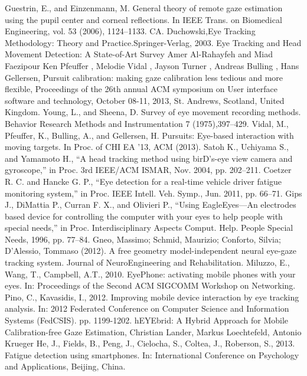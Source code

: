   \begin{thebibliography}{00}
    Guestrin, E., and Einzenmann, M. General theory of remote gaze estimation using the pupil center and corneal reflections. In IEEE Trans. on Biomedical Engineering, vol. 53 (2006), 1124–1133.
   CA. Duchowski,Eye Tracking Methodology: Theory and Practice.Springer-Verlag, 2003.
   Eye Tracking and Head Movement Detection: A State-of-Art Survey Amer Al-Rahayfeh and Miad Faezipour
   Ken Pfeuffer , Melodie Vidal , Jayson Turner , Andreas Bulling , Hans Gellersen, Pursuit calibration: making gaze calibration less tedious and more flexible, Proceedings of the 26th annual ACM symposium on User interface software and technology, October 08-11, 2013, St. Andrews, Scotland, United Kingdom.
   Young, L., and Sheena, D. Survey of eye movement recording methods. Behavior Research Methods and Instrumentation 7 (1975),397–429.
   Vidal, M., Pfeuffer, K., Bulling, A., and Gellersen, H. Pursuits: Eye-based interaction with moving targets. In Proc. of CHI EA ’13, ACM (2013).
   Satoh K., Uchiyama S., and Yamamoto H., “A head tracking method using birD's-eye view camera and gyroscope,” in Proc. 3rd IEEE/ACM ISMAR, Nov. 2004, pp. 202–211.
   Coetzer R. C. and Hancke G. P., “Eye detection for a real-time vehicle driver fatigue monitoring system,” in Proc. IEEE Intell. Veh. Symp., Jun. 2011, pp. 66–71.
   Gips J., DiMattia P., Curran F. X., and Olivieri P., “Using EagleEyes—An electrodes based device for controlling the computer with your eyes to help people with special needs,” in Proc. Interdisciplinary Aspects Comput. Help. People Special Needs, 1996, pp. 77–84.
   Gneo, Massimo; Schmid, Maurizio; Conforto, Silvia; D’Alessio, Tommaso (2012). A free geometry model-independent neural eye-gaze tracking system. Journal of NeuroEngineering and Rehabilitation. 
   Miluzzo, E., Wang, T., Campbell, A.T., 2010. EyePhone: activating mobile phones with your eyes. In: Proceedings of the Second ACM SIGCOMM Workshop on Networking.
   Pino, C., Kavasidis, I., 2012. Improving mobile device interaction by eye tracking analysis. In: 2012 Federated Conference on Computer Science and Information Systems (FedCSIS). pp. 1199-1202.
   hEYEbrid: A Hybrid Approach for Mobile Calibration-free Gaze Estimation, Christian Lander, Markus Loechtefeld, Antonio Krueger
   He, J., Fields, B., Peng, J., Cielocha, S., Coltea, J., Roberson, S., 2013. Fatigue detection using smartphones. In: International Conference on Psychology and Applications, Beijing, China.

\end{thebibliography}
